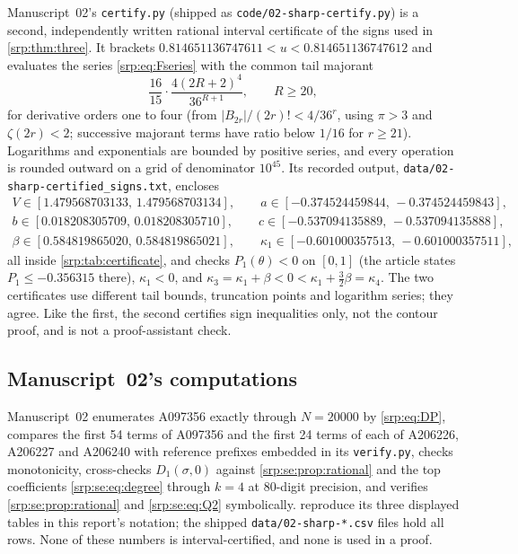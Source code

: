 \documentclass[11pt,a4paper]{article}
\numberwithin{equation}{section}
\theoremstyle{definition}
\theoremstyle{remark}
\begin{document}
Manuscript~02's \texttt{certify.py} (shipped as
\texttt{code/02-sharp-certify.py}) is a second, independently written
rational interval certificate of the signs used in
\cref{srp:thm:three}. It brackets
$0.814651136747611<u<0.814651136747612$ and evaluates the series
\eqref{srp:eq:Fseries} with the common tail majorant
\[
 \frac{16}{15}\cdot\frac{4(2R+2)^4}{36^{R+1}},\qquad R\ge20,
\]
for derivative orders one to four (from $|B_{2r}|/(2r)!<4/36^r$, using
$\pi>3$ and $\zeta(2r)<2$; successive majorant terms have ratio below
$1/16$ for $r\ge21$). Logarithms and exponentials are bounded by positive
series, and every operation is rounded outward on a grid of denominator
$10^{45}$. Its recorded output, \texttt{data/02-sharp-certified\_signs.txt},
encloses
\begin{gather*}
 V\in[1.479568703133,\,1.479568703134],\qquad
 a\in[-0.374524459844,\,-0.374524459843],\\
 b\in[0.018208305709,\,0.018208305710],\qquad
 c\in[-0.537094135889,\,-0.537094135888],\\
 \beta\in[0.584819865020,\,0.584819865021],\qquad
 \kappa_1\in[-0.601000357513,\,-0.601000357511],
\end{gather*}
all inside \cref{srp:tab:certificate}, and checks $P_1(\theta)<0$ on
$[0,1]$ (the article states $P_1\le-0.356315$ there), $\kappa_1<0$, and
$\kappa_3=\kappa_1+\beta<0<\kappa_1+\tfrac32\beta=\kappa_4$. The two
certificates use different tail bounds, truncation points and logarithm
series; they agree. Like the first, the second certifies sign
inequalities only, not the contour proof, and is not a proof-assistant
check.

\subsection{Manuscript~02's computations}
\label{srp:se:sec:numerics}

Manuscript~02 enumerates A097356 exactly through $N=20000$ by
\eqref{srp:eq:DP}, compares the first 54 terms of A097356 and the first 24
terms of each of A206226, A206227 and A206240 with reference prefixes
embedded in its \texttt{verify.py}, checks monotonicity, cross-checks
$D_1(\sigma,0)$ against \cref{srp:se:prop:rational} and the top
coefficients \eqref{srp:se:eq:degree} through $k=4$ at 80-digit precision,
and verifies \cref{srp:se:prop:rational} and \eqref{srp:se:eq:Q2}
symbolically. 
reproduce its three displayed tables in this report's notation; the
shipped \texttt{data/02-sharp-*.csv} files hold all rows. None of these
numbers is interval-certified, and none is used in a proof.
\end{document}
